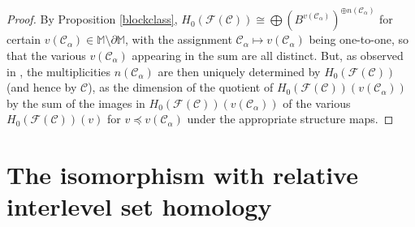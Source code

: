 \documentclass[11pt]{amsart}
\theoremstyle{definition}
\theoremstyle{remark}
\numberwithin{equation}{section}
\begin{document}
\begin{proof}
	By Proposition \ref{blockclass}, $H_0(\mathcal{F}(\mathcal{C}))\cong \bigoplus (B^{v(\mathcal{C}_{\alpha})})^{\oplus n(\mathcal{C}_{\alpha})}$ for certain $ v(\mathcal{C}_{\alpha})\in \mathbb{M}\setminus\partial\mathbb{M}$, 
	with the assignment $\mathcal{C}_{\alpha}\mapsto v(\mathcal{C}_{\alpha})$ being one-to-one, so that the various $v(\mathcal{C}_{\alpha})$ appearing in the sum are all distinct.  
	But, as observed in \cite[Section 2.2]{BBF20}, the multiplicities $n(\mathcal{C}_{\alpha})$ are then uniquely determined by  $H_0(\mathcal{F}(\mathcal{C}))$ (and hence by $\mathcal{C}$), as the dimension of the quotient of
	 $H_0(\mathcal{F}(\mathcal{C}))(v(\mathcal{C}_{\alpha}))$ by the sum of the images in $H_0(\mathcal{F}(\mathcal{C}))(v(\mathcal{C}_{\alpha}))$  of the various   $H_0(\mathcal{F}(\mathcal{C}))(v)$ for $v\preceq v(\mathcal{C}_{\alpha})$ under the appropriate structure maps.
\end{proof}
	
\section{The isomorphism with relative interlevel set homology}\label{rishsect}
\end{document}
